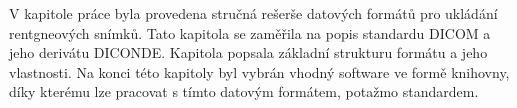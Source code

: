 V kapitole práce byla provedena stručná rešerše datových formátů pro ukládání rentgneových snímků. Tato kapitola se zaměřila na popis standardu DICOM a jeho derivátu DICONDE. Kapitola popsala základní strukturu formátu a jeho vlastnosti. Na konci této kapitoly byl vybrán vhodný software ve formě knihovny, díky kterému lze pracovat s tímto datovým formátem, potažmo standardem.